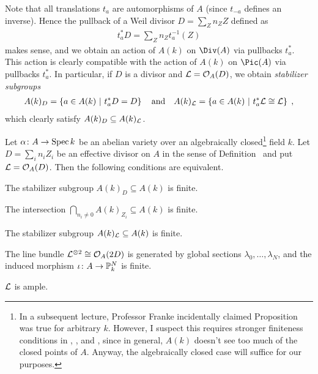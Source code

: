 \documentclass[a4paper,parskip=half,numbers=enddot, DIV=12]{scrreprt}
\begin{document}
Note that all translations $t_a$ are automorphisms of $A$ (since $t_{-a}$ defines an inverse). Hence the pullback of a Weil divisor $D=\sum_Zn_ZZ$ defined as 
\begin{align*}
	t_a^*D=\sum_Zn_Zt_a^{-1}(Z)
\end{align*}
makes sense, and we obtain an action of $A(k)$ on $\Div(A)$ via pullbacks $t_a^*$. This action is clearly compatible with the action of $A(k)$ on $\Pic(A)$ via pullbacks $t_a^*$. In particular, if $D$ is a divisor and $\mathcal{L}=\mathcal{O}_A(D)$, we obtain \emph{stabilizer subgroups}
\begin{align*}
	A(k)_D=\left\{a\in A(k)\ \middle|\  t_a^*D=D\right\}\quad\text{and}\quad A(k)_{\mathcal{L}}=\left\{a\in A(k)\ \middle|\  t_a^*\mathcal{L}\cong\mathcal{L}\right\}\;,
\end{align*}
which clearly satisfy $A(k)_D\subseteq A(k)_{\mathcal{L}}$.
\begin{prop}
	Let $\alpha\colon A\morphism \Spec k$ be an abelian variety over an algebraically closed\footnote{In a subsequent lecture, Professor Franke incidentally claimed Proposition~ was true for arbitrary $k$. However, I suspect this requires stronger finiteness conditions in , , and , since in general, $A(k)$ doesn't see too much of the closed points of $A$. Anyway, the algebraically closed case will suffice for our purposes.} field $k$. Let $D=\sum_in_iZ_i$ be an effective divisor on $A$ in the sense of Definition~ and put $\mathcal{L}=\mathcal{O}_A(D)$. Then the following conditions are equivalent.
	\begin{alphanumerate}
		\item The stabilizer subgroup $A(k)_D\subseteq A(k)$ is finite.
		\item The intersection $\bigcap_{n_i\neq 0}A(k)_{Z_i}\subseteq A(k)$ is finite.
		\item The stabilizer subgroup $A(k)_{\mathcal{L}}\subseteq A(k)$ is finite.
		\item The line bundle $\mathcal{L}^{\otimes 2}\cong \mathcal{O}_A(2D)$ is generated by global sections $\lambda_0,\ldots,\lambda_N$, and the induced morphism $\iota\colon A\morphism\IP_k^N$ is finite.
		\item $\mathcal{L}$ is ample.
	\end{alphanumerate}
\end{prop}
\end{document}
